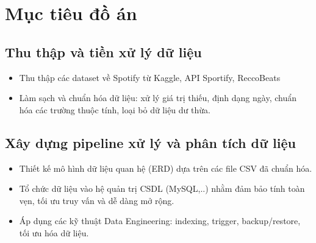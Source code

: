 \documentclass{../hcmut-report}
\begin{document}
\section{Mục tiêu đồ án}

\subsection{Thu thập và tiền xử lý dữ liệu}
\begin{itemize}
    \item Thu thập các dataset về Spotify từ Kaggle, API Sportify, ReccoBeats
    \item Làm sạch và chuẩn hóa dữ liệu: xử lý giá trị thiếu, định dạng ngày, chuẩn hóa các trường thuộc tính, loại bỏ dữ liệu dư thừa.
\end{itemize}


\subsection{Xây dựng pipeline xử lý và phân tích dữ liệu}
\begin{itemize}
    \item Thiết kế mô hình dữ liệu quan hệ (ERD) dựa trên các file CSV đã chuẩn hóa.
    \item Tổ chức dữ liệu vào hệ quản trị CSDL (MySQL,..) nhằm đảm bảo tính toàn vẹn, tối ưu truy vấn và dễ dàng mở rộng.
    \item Áp dụng các kỹ thuật Data Engineering: indexing, trigger, backup/restore, tối ưu hóa dữ liệu.
\end{itemize}
\end{document}
